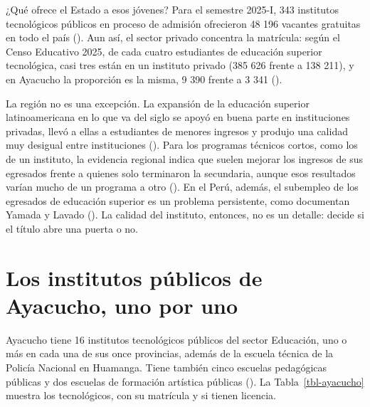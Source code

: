\documentclass[
  jou,
  floatsintext,
  longtable,
  a4paper,
  nolmodern,
  notxfonts,
  notimes,
  12pt,
  colorlinks=true,linkcolor=blue,citecolor=blue,urlcolor=blue]{apa7}
\begin{document}
¿Qué ofrece el Estado a esos jóvenes? Para el semestre 2025-I, 343
institutos tecnológicos públicos en proceso de admisión ofrecieron 48
196 vacantes gratuitas en todo el país
(). Aun así, el sector privado concentra la
matrícula: según el Censo Educativo 2025, de cada cuatro estudiantes de
educación superior tecnológica, casi tres están en un instituto privado
(385 626 frente a 138 211), y en Ayacucho la proporción es la misma, 9
390 frente a 3 341
().

La región no es una excepción. La expansión de la educación superior
latinoamericana en lo que va del siglo se apoyó en buena parte en
instituciones privadas, llevó a ellas a estudiantes de menores ingresos
y produjo una calidad muy desigual entre instituciones
(). Para los programas técnicos cortos, como los de un instituto, la
evidencia regional indica que suelen mejorar los ingresos de sus
egresados frente a quienes solo terminaron la secundaria, aunque esos
resultados varían mucho de un programa a otro
(). En el
Perú, además, el subempleo de los egresados de educación superior es un
problema persistente, como documentan Yamada y Lavado
(). La calidad del
instituto, entonces, no es un detalle: decide si el título abre una
puerta o no.

\section{Los institutos públicos de Ayacucho, uno por
uno}\label{los-institutos-puxfablicos-de-ayacucho-uno-por-uno}

Ayacucho tiene 16 institutos tecnológicos públicos del sector Educación,
uno o más en cada una de sus once provincias, además de la escuela
técnica de la Policía Nacional en Huamanga. Tiene también cinco escuelas
pedagógicas públicas y dos escuelas de formación artística públicas
(). La Tabla~\ref{tbl-ayacucho} muestra los
tecnológicos, con su matrícula y si tienen licencia.
\end{document}
